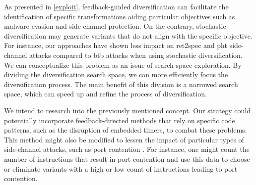     
\begin{strategy}
As presented in \autoref{exploit}, feedback-guided diversification can facilitate the identification of specific transformations aiding particular objectives such as malware evasion and side-channel protection. 
On the contrary, stochastic diversification may generate variants that do not align with the specific objective. 
For instance, our approaches have shown less impact on ret2spec and pht side-channel attacks compared to btb attacks when using stochastic diversification.
We can conceptualize this problem as an issue of search space exploration. 
By dividing the diversification search space, we can more efficiently focus the diversification process. 
The main benefit of this division is a narrowed search space, which can speed up and refine the process of diversification. 


We intend to research into the previously mentioned concept. 
Our strategy could potentially incorporate feedback-directed methods that rely on specific code patterns, such as the disruption of embedded timers, to combat these problems. 
This method might also be modified to lessen the impact of particular types of side-channel attacks, such as port contention \cite{10.1145/3488932.3517411}. 
For instance, one might count the number of instructions that result in port contention and use this data to choose or eliminate variants with a high or low count of instructions leading to port contention.



\begin{comment}%


We utilize \ref{rq:performance} to gauge the performance implications of the variants generated by \tool. 
A collection of 134 real-world programs is employed as our foundation for this task. 
The performance evaluation of the generated variants takes into account the \Wasm program size, wasmtime-compiled binary size, compilation duration, and the execution time of each program and its variants. 
For each program, we create a maximum of 50 unique variants, each containing 1000 stacked transformations diversified with 50 distinct seeds.
In conclusion, we assess these parameters for a total of 6834 programs, calculated as 134 plus $134\times50$.




\end{comment}

\end{strategy}